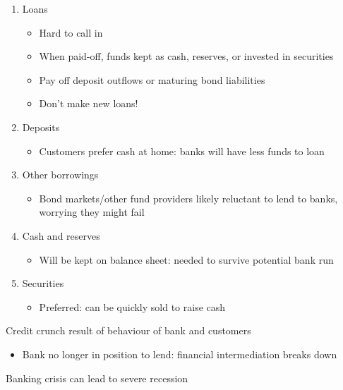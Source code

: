 \documentclass{beamer}
\begin{document}
\begin{frame}
  \begin{enumerate}
  \item Loans
  \begin{itemize}
    \item Hard to call in
    \item When paid-off, funds kept as cash, reserves, or invested in securities
    \item Pay off deposit outflows or maturing bond liabilities
    \item Don't make new loans!
  \end{itemize}
  \item Deposits
  \begin{itemize}
    \item Customers prefer cash at home: banks will have less funds to loan
  \end{itemize}
  \item Other borrowings
  \begin{itemize}
    \item Bond markets/other fund providers likely reluctant to lend to banks, worrying they might fail    
  \end{itemize}
  \item Cash and reserves
  \begin{itemize}
    \item Will be kept on balance sheet: needed to survive potential bank run
  \end{itemize}
  \item Securities
  \begin{itemize}
    \item Preferred: can be quickly sold to raise cash
  \end{itemize}
\end{enumerate} 
\end{frame}

\begin{frame}
  Credit crunch result of behaviour of bank and customers
  \begin{itemize}
    \item Bank no longer in position to lend: financial intermediation breaks down
  \end{itemize}
  \medskip
  Banking crisis can lead to severe recession
\end{frame}
\end{document}

